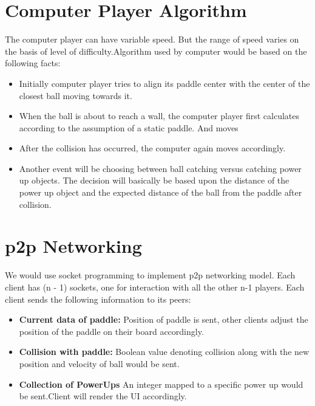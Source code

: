 \documentclass{article}
\begin{document}
			\section{Computer Player Algorithm}
			\par\noindent The computer player can have variable speed. But the range of speed varies on the basis of level of difficulty.Algorithm used by computer would be based on the following facts:

			\begin{itemize}
			\item Initially computer player tries to align its paddle center with the center of the closest ball moving towards it.
			\item When the ball is about to reach a wall, the computer player first calculates according to the assumption of a static paddle. And moves
			\item After the collision has occurred, the computer again moves accordingly.
			\item Another event will be choosing between ball catching versus catching power up objects. The decision will basically be based upon the distance of the power up object and the expected distance of the ball from the paddle after collision.
			\end{itemize}

			\section{p2p Networking}
			\par\noindent We would use socket programming to implement p2p networking model. Each client has (n - 1) sockets, one for interaction with all the other n-1 players. Each client sends the following information to its peers:
			\begin{itemize}
			\item \textbf{Current data of paddle:} Position of paddle is sent,  other clients adjust the position of the paddle on their board accordingly. 
			\item \textbf{Collision with paddle:} Boolean value denoting collision along with the new position and velocity of ball would be sent.
			\item \textbf{Collection of PowerUps} An integer mapped to a specific power up would be sent.Client will render the UI accordingly.
			\end{itemize}
\end{document}
